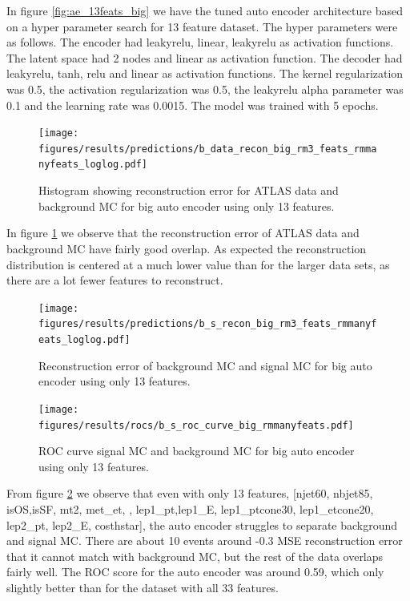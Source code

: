 \documentclass[ reprint, amsmath,amssymb, aps, nofootinbib]{revtex4-2}
\begin{document}
In figure \ref{fig:ae_13feats_big} we have the tuned auto encoder architecture based on a hyper parameter search for 13 feature dataset. The hyper parameters were as follows. The encoder had leakyrelu, linear, leakyrelu as activation functions. The latent space had 2 nodes and linear as activation function. The decoder had leakyrelu, tanh, relu and linear as activation functions. The kernel regularization was 0.5, the activation regularization was 0.5, the leakyrelu alpha parameter was 0.1 and the learning rate was 0.0015. The model was trained with 5 epochs.

\begin{figure}[H]
     \centering
         \texttt{[image: figures/results/predictions/b\_data\_recon\_big\_rm3\_feats\_rmmanyfeats\_loglog.pdf]}
         \caption{Histogram showing reconstruction error for ATLAS data and background MC for big auto encoder using only 13 features.}
     \label{fig:data_b_big_pred_13feats}
\end{figure}

In figure \ref{fig:data_b_big_pred_13feats} we observe that the reconstruction error of ATLAS data and background MC have fairly good overlap. As expected the reconstruction distribution is centered at a much lower value than for the larger data sets, as there are a lot fewer features to reconstruct. 

\begin{figure}[H]
    \centering
    \texttt{[image: figures/results/predictions/b\_s\_recon\_big\_rm3\_feats\_rmmanyfeats\_loglog.pdf]}
    \caption{Reconstruction error of background MC and signal MC for big auto encoder using only 13 features. }
    \label{fig:roc_sig_big_13feats}
\end{figure}

\begin{figure}[H]
    \centering
         \texttt{[image: figures/results/rocs/b\_s\_roc\_curve\_big\_rmmanyfeats.pdf]}
         \caption{ROC curve signal MC and background MC for big auto encoder using only 13 features.}
         \label{fig:s_b_big_roc_13}
\end{figure}



From figure \ref{fig:roc_sig_big_13feats} we observe that even with only 13 features, 
[njet60,  nbjet85, isOS,isSF,  mt2, met\_et,  , lep1\_pt,lep1\_E, lep1\_ptcone30, lep1\_etcone20, lep2\_pt,  lep2\_E, costhstar], the auto encoder struggles to separate background and signal MC. There are about 10 events around -0.3 MSE reconstruction error that it cannot match with background MC, but the rest of the data overlaps fairly well. The ROC score for the auto encoder was around 0.59, which only slightly better than for the dataset with all 33 features. \par
\end{document}
